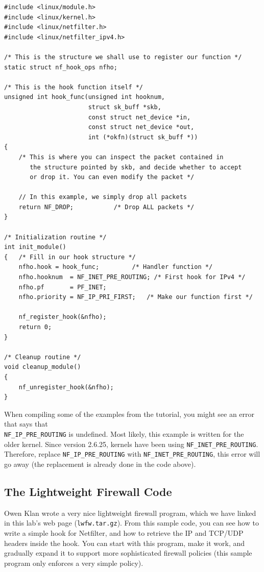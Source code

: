\begin{Verbatim}[frame=single] 
#include <linux/module.h>
#include <linux/kernel.h>
#include <linux/netfilter.h>
#include <linux/netfilter_ipv4.h>

/* This is the structure we shall use to register our function */
static struct nf_hook_ops nfho;

/* This is the hook function itself */
unsigned int hook_func(unsigned int hooknum,
                       struct sk_buff *skb,
                       const struct net_device *in,
                       const struct net_device *out,
                       int (*okfn)(struct sk_buff *))
{
    /* This is where you can inspect the packet contained in
       the structure pointed by skb, and decide whether to accept 
       or drop it. You can even modify the packet */

    // In this example, we simply drop all packets
    return NF_DROP;           /* Drop ALL packets */
}

/* Initialization routine */
int init_module()
{   /* Fill in our hook structure */
    nfho.hook = hook_func;         /* Handler function */
    nfho.hooknum  = NF_INET_PRE_ROUTING; /* First hook for IPv4 */
    nfho.pf       = PF_INET;
    nfho.priority = NF_IP_PRI_FIRST;   /* Make our function first */

    nf_register_hook(&nfho);
    return 0;
}

/* Cleanup routine */
void cleanup_module()
{
    nf_unregister_hook(&nfho);
}
\end{Verbatim} 

When compiling some of the examples from the tutorial, you might see an error that says
that\\ {\tt NF\_IP\_PRE\_ROUTING} is undefined. Most likely, this example
is written for the older \linux kernel. Since version 2.6.25,
kernels have been using {\tt NF\_INET\_PRE\_ROUTING}. Therefore, 
replace {\tt NF\_IP\_PRE\_ROUTING} with {\tt NF\_INET\_PRE\_ROUTING}, 
this error will go away (the replacement is already done in the code above).


\subsection{The Lightweight Firewall Code}

Owen Klan wrote a very nice lightweight firewall program, which we have linked
in this lab's web page ({\tt lwfw.tar.gz}). From this sample code, you can see
how to write a simple hook for Netfilter, and how to retrieve the IP and 
TCP/UDP headers inside the hook. You can start with this program,
make it work, and gradually expand it to support more sophisticated firewall
policies (this sample program only enforces a very simple policy).


